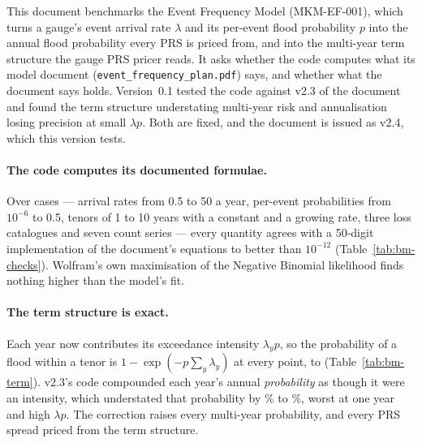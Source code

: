 \documentclass[11pt,a4paper]{article}
\begin{document}
\sloppy

\mkmtitlepage
\mkmlegalpage

\tableofcontents
\clearpage

\mkmexecsummary

This document benchmarks the Event Frequency Model (MKM-EF-001), which turns a
gauge's event arrival rate $\lambda$ and its per-event flood probability $p$ into
the annual flood probability every PRS is priced from, and into the multi-year term
structure the gauge PRS pricer reads. It asks whether the code computes what its
model document (\texttt{event\_frequency\_plan.pdf}) says, and whether what the
document says holds. Version~0.1 tested the code against v2.3 of the document and
found the term structure understating multi-year risk and annualisation losing
precision at small $\lambda p$. Both are fixed, and the document is issued as v2.4,
which this version tests.

\paragraph{The code computes its documented formulae.} Over \bmCases{} cases ---
arrival rates from 0.5 to 50 a year, per-event probabilities from $10^{-6}$ to 0.5,
tenors of 1 to 10 years with a constant and a growing rate, three loss catalogues
and seven count series --- every quantity agrees with a 50-digit implementation of
the document's equations to better than $10^{-12}$ (Table~\ref{tab:bm-checks}).
\bmWolframConfirms{} Wolfram's own maximisation of the Negative Binomial likelihood
finds nothing higher than the model's fit.

\paragraph{The term structure is exact.} Each year now contributes its exceedance
intensity $\lambda_y p$, so the probability of a flood within a tenor is
$1-\exp(-p\sum_y\lambda_y)$ at every point, to \bmStructure{}
(Table~\ref{tab:bm-term}). v2.3's code compounded each year's annual
\emph{probability} as though it were an intensity, which understated that
probability by \bmTermLow\% to \bmTermHigh\%, worst at one year and high
$\lambda p$. The correction raises every multi-year probability, and every PRS
spread priced from the term structure.
\end{document}
